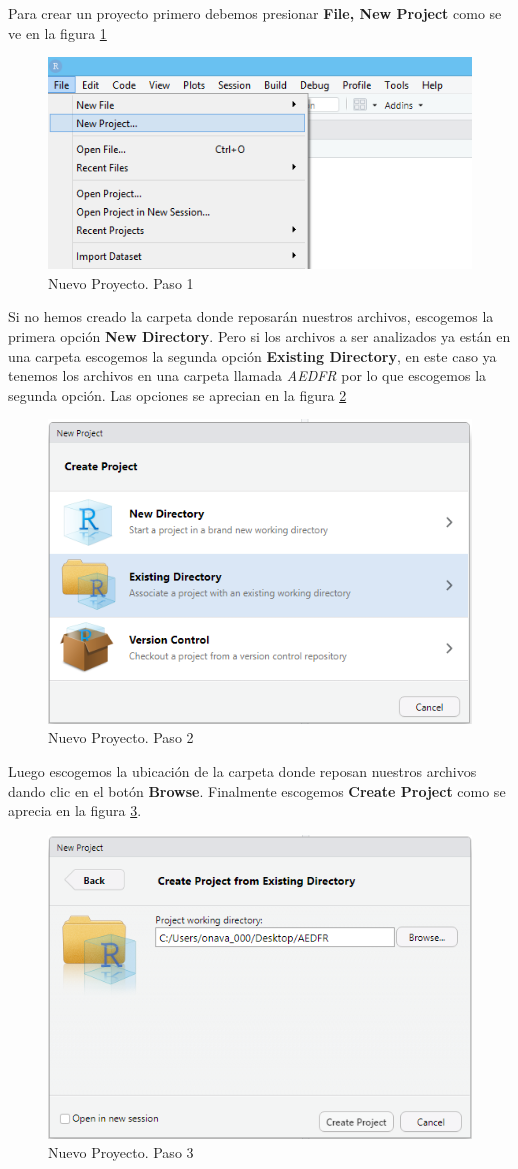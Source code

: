 \documentclass[
]{krantz}
\begin{document}
Para crear un proyecto primero debemos presionar \textbf{File, New Project} como se ve en la figura \ref{fig:project1}

\begin{figure}[!h]

{\centering \includegraphics[width=0.45\linewidth]{project1} 

}

\caption{Nuevo Proyecto. Paso 1}\label{fig:project1}
\end{figure}

Si no hemos creado la carpeta donde reposarán nuestros archivos, escogemos la primera opción \textbf{New Directory}. Pero si los archivos a ser analizados ya están en una carpeta escogemos la segunda opción \textbf{Existing Directory}, en este caso ya tenemos los archivos en una carpeta llamada \emph{AEDFR} por lo que escogemos la segunda opción. Las opciones se aprecian en la figura \ref{fig:project2}

\begin{figure}[!h]

{\centering \includegraphics[width=0.45\linewidth]{project2} 

}

\caption{Nuevo Proyecto. Paso 2}\label{fig:project2}
\end{figure}

Luego escogemos la ubicación de la carpeta donde reposan nuestros archivos dando clic en el botón \textbf{Browse}. Finalmente escogemos \textbf{Create Project} como se aprecia en la figura \ref{fig:project3}.

\begin{figure}[!h]

{\centering \includegraphics[width=0.45\linewidth]{project3} 

}

\caption{Nuevo Proyecto. Paso 3}\label{fig:project3}
\end{figure}
\end{document}
